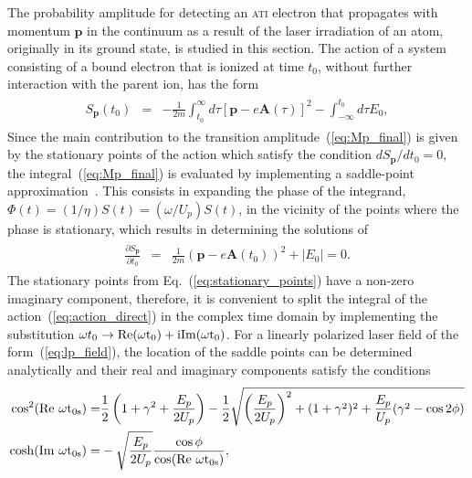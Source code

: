 The probability amplitude for detecting an \textsc{ati} electron that
propagates with momentum $\mathbf{p}$ in the continuum as a result of
the laser irradiation of an atom, originally in its ground state, is
studied in this section. The action of a system consisting of a bound
electron that is ionized at time $t_{0}$, without further interaction
with the parent ion, has the form~\cite{phd_Kopold,Becker_ati2002}
%
\begin{eqnarray}
  \label{eq:action_direct}
  \begin{split}
  S_{\mathbf{p}}(t_{0}) & = &
-\frac{1}{2m}\int_{t_{0}}^{\infty}{d\tau [\mathbf{p} - e\mathbf{A}(\tau)]^{2}}
- \int_{-\infty}^{t_{0}}{d\tau E_{0}},
\end{split}
\end{eqnarray}
%
Since the main contribution to the transition
amplitude~(\ref{eq:Mp_final}) is given by the stationary points of the
action which satisfy the condition $dS_{\mathbf{p}} / dt_{0} = 0$, the
integral~(\ref{eq:Mp_final}) is evaluated by implementing a
saddle-point approximation~\cite{spa_1960}. This consists in expanding
the phase of the integrand, $\Phi(t) = (1/\eta) S(t) = (\omega /
U_{p}) S(t)$, in the vicinity of the points where the phase is
stationary, which results in determining the solutions of
%
\begin{eqnarray}
  \label{eq:stationary_points}
  \begin{split}
    \frac{\partial S_{\mathbf{p}}}{\partial t_{0}} & = &
    \frac{1}{2m} (\mathbf{p} - e\mathbf{A}(t_{0}))^{2} + |E_{0}| = 0.
  \end{split}
\end{eqnarray}
%
The stationary points from Eq.~(\ref{eq:stationary_points}) have a
non-zero imaginary component, therefore, it is convenient to split the
integral of the action~(\ref{eq:action_direct}) in the complex time
domain by implementing the substitution $\omega t_{0} \to
\rm{Re}(\omega t_{0}) + i\rm{Im}(\omega t_{0})$. For a linearly
polarized laser field of the form~(\ref{eq:lp_field}), the location of
the saddle points can be determined analytically and their real and
imaginary components satisfy the conditions
%
\begin{eqnarray}
  \label{eq:ReIm_eqs}
  \begin{split}
    \cos^{2}(\rm{Re}\ \omega t_{0s}) = & \frac{1}{2}
    \left( 1 + \gamma^{2} + \frac{E_{p}}{2U_{p}} \right)
    - \frac{1}{2}\sqrt{\left( \frac{E_{p}}{2U_{p}} \right)^{2}
    + (1 + \gamma^2)^2 + \frac{E_{p}}{U_{p}}(\gamma^2 - \cos 2\phi)}
    \\
    \cosh(\rm{Im}\ \omega t_{0s}) = & - \sqrt{\frac{E_{p}}{2U_{p}}}
    \frac{\cos\phi}{\cos(\rm{Re}\ \omega t_{0s})},
  \end{split}
\end{eqnarray}
